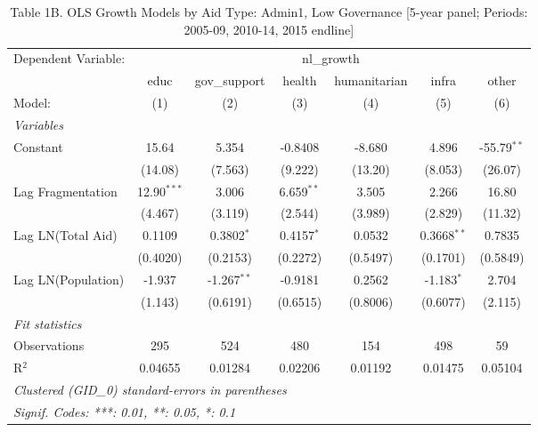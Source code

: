 
\begin{table}[H]
   \caption{Table 1B. OLS Growth Models by Aid Type: Admin1, Low Governance [5-year panel; Periods: 2005-09, 2010-14, 2015 endline]}
   \centering
   \begin{tabular}{lcccccc}
      \tabularnewline \midrule \midrule
      Dependent Variable: & \multicolumn{6}{c}{nl\_growth}\\
                         & educ          & gov\_support  & health       & humanitarian & infra         & other \\   
      Model:             & (1)           & (2)           & (3)          & (4)          & (5)           & (6)\\  
      \midrule
      \emph{Variables}\\
      Constant           & 15.64         & 5.354         & -0.8408      & -8.680       & 4.896         & -55.79$^{**}$\\   
                         & (14.08)       & (7.563)       & (9.222)      & (13.20)      & (8.053)       & (26.07)\\   
      Lag Fragmentation  & 12.90$^{***}$ & 3.006         & 6.659$^{**}$ & 3.505        & 2.266         & 16.80\\   
                         & (4.467)       & (3.119)       & (2.544)      & (3.989)      & (2.829)       & (11.32)\\   
      Lag LN(Total Aid)  & 0.1109        & 0.3802$^{*}$  & 0.4157$^{*}$ & 0.0532       & 0.3668$^{**}$ & 0.7835\\   
                         & (0.4020)      & (0.2153)      & (0.2272)     & (0.5497)     & (0.1701)      & (0.5849)\\   
      Lag LN(Population) & -1.937        & -1.267$^{**}$ & -0.9181      & 0.2562       & -1.183$^{*}$  & 2.704\\   
                         & (1.143)       & (0.6191)      & (0.6515)     & (0.8006)     & (0.6077)      & (2.115)\\   
      \midrule
      \emph{Fit statistics}\\
      Observations       & 295           & 524           & 480          & 154          & 498           & 59\\  
      R$^2$              & 0.04655       & 0.01284       & 0.02206      & 0.01192      & 0.01475       & 0.05104\\  
      \midrule \midrule
      \multicolumn{7}{l}{\emph{Clustered (GID\_0) standard-errors in parentheses}}\\
      \multicolumn{7}{l}{\emph{Signif. Codes: ***: 0.01, **: 0.05, *: 0.1}}\\
   \end{tabular}
\end{table}



